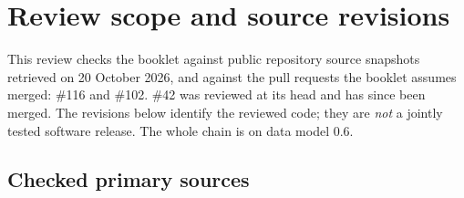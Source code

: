 \chapter{Review scope and source revisions}
\label{app:review}

This review checks the booklet against public repository source snapshots
retrieved on 20 October 2026, and against the pull requests the booklet
assumes merged:  \#116 and \#102.  \#42
was reviewed at its head and has since been merged. The revisions below identify the reviewed code; they are
\emph{not} a jointly tested software release. The whole chain is on data
model 0.6.

\section{Checked primary sources}

